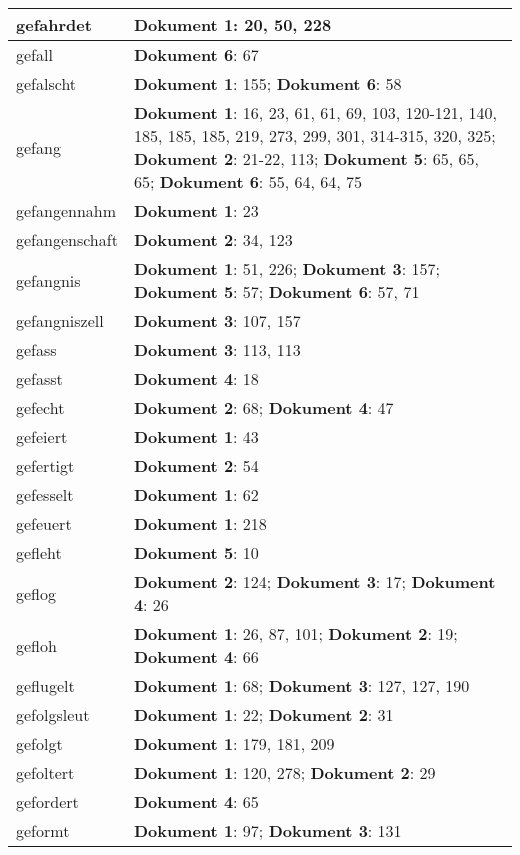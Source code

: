 \documentclass[a5paper]{article}
\begin{document}
\begin{longtable}[l]{|l|p{3in}|}
\hline
gefahrdet & \textbf{Dokument 1}: 20, 50, 228 \\
\hline
gefall & \textbf{Dokument 6}: 67 \\
\hline
gefalscht & \textbf{Dokument 1}: 155; \textbf{Dokument 6}: 58 \\
\hline
gefang & \textbf{Dokument 1}: 16, 23, 61, 61, 69, 103, 120-121, 140, 185, 185, 185, 219, 273, 299, 301, 314-315, 320, 325; \textbf{Dokument 2}: 21-22, 113; \textbf{Dokument 5}: 65, 65, 65; \textbf{Dokument 6}: 55, 64, 64, 75 \\
\hline
gefangennahm & \textbf{Dokument 1}: 23 \\
\hline
gefangenschaft & \textbf{Dokument 2}: 34, 123 \\
\hline
gefangnis & \textbf{Dokument 1}: 51, 226; \textbf{Dokument 3}: 157; \textbf{Dokument 5}: 57; \textbf{Dokument 6}: 57, 71 \\
\hline
gefangniszell & \textbf{Dokument 3}: 107, 157 \\
\hline
gefass & \textbf{Dokument 3}: 113, 113 \\
\hline
gefasst & \textbf{Dokument 4}: 18 \\
\hline
gefecht & \textbf{Dokument 2}: 68; \textbf{Dokument 4}: 47 \\
\hline
gefeiert & \textbf{Dokument 1}: 43 \\
\hline
gefertigt & \textbf{Dokument 2}: 54 \\
\hline
gefesselt & \textbf{Dokument 1}: 62 \\
\hline
gefeuert & \textbf{Dokument 1}: 218 \\
\hline
gefleht & \textbf{Dokument 5}: 10 \\
\hline
geflog & \textbf{Dokument 2}: 124; \textbf{Dokument 3}: 17; \textbf{Dokument 4}: 26 \\
\hline
gefloh & \textbf{Dokument 1}: 26, 87, 101; \textbf{Dokument 2}: 19; \textbf{Dokument 4}: 66 \\
\hline
geflugelt & \textbf{Dokument 1}: 68; \textbf{Dokument 3}: 127, 127, 190 \\
\hline
gefolgsleut & \textbf{Dokument 1}: 22; \textbf{Dokument 2}: 31 \\
\hline
gefolgt & \textbf{Dokument 1}: 179, 181, 209 \\
\hline
gefoltert & \textbf{Dokument 1}: 120, 278; \textbf{Dokument 2}: 29 \\
\hline
gefordert & \textbf{Dokument 4}: 65 \\
\hline
geformt & \textbf{Dokument 1}: 97; \textbf{Dokument 3}: 131 \\

\end{longtable}
\end{document}
